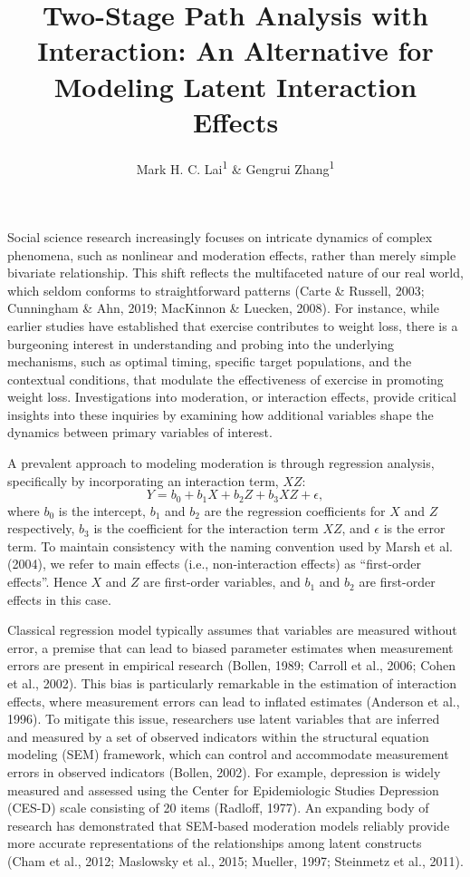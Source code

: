 \documentclass[
  man,mask]{apa6}
\title{Two-Stage Path Analysis with Interaction: An Alternative for Modeling Latent Interaction Effects}
\author{Mark H. C. Lai\textsuperscript{1} \& Gengrui Zhang\textsuperscript{1}}
\date{}
\affiliation{\vspace{0.5cm}\textsuperscript{1} \protect{Department of Psychology, University of Southern California}}
\begin{document}
\maketitle

Social science research increasingly focuses on intricate dynamics of complex phenomena, such as nonlinear and moderation effects, rather than merely simple bivariate relationship. This shift reflects the multifaceted nature of our real world, which seldom conforms to straightforward patterns (Carte \& Russell, 2003; Cunningham \& Ahn, 2019; MacKinnon \& Luecken, 2008). For instance, while earlier studies have established that exercise contributes to weight loss, there is a burgeoning interest in understanding and probing into the underlying mechanisms, such as optimal timing, specific target populations, and the contextual conditions, that modulate the effectiveness of exercise in promoting weight loss. Investigations into moderation, or interaction effects, provide critical insights into these inquiries by examining how additional variables shape the dynamics between primary variables of interest.

A prevalent approach to modeling moderation is through regression analysis, specifically by incorporating an interaction term, \(XZ\):
\begin{equation}
Y = b_{0} + b_{1}X + b_{2}Z + b_{3}XZ + \epsilon,
\end{equation}
where \(b_{0}\) is the intercept, \(b_{1}\) and \(b_{2}\) are the regression coefficients for \(X\) and \(Z\) respectively, \(b_{3}\) is the coefficient for the interaction term \(XZ\), and \(\epsilon\) is the error term. To maintain consistency with the naming convention used by Marsh et al. (2004), we refer to main effects (i.e., non-interaction effects) as ``first-order effects''. Hence \(X\) and \(Z\) are first-order variables, and \(b_{1}\) and \(b_{2}\) are first-order effects in this case.

Classical regression model typically assumes that variables are measured without error, a premise that can lead to biased parameter estimates when measurement errors are present in empirical research (Bollen, 1989; Carroll et al., 2006; Cohen et al., 2002). This bias is particularly remarkable in the estimation of interaction effects, where measurement errors can lead to inflated estimates (Anderson et al., 1996). To mitigate this issue, researchers use latent variables that are inferred and measured by a set of observed indicators within the structural equation modeling (SEM) framework, which can control and accommodate measurement errors in observed indicators (Bollen, 2002). For example, depression is widely measured and assessed using the Center for Epidemiologic Studies Depression (CES-D) scale consisting of 20 items (Radloff, 1977). An expanding body of research has demonstrated that SEM-based moderation models reliably provide more accurate representations of the relationships among latent constructs (Cham et al., 2012; Maslowsky et al., 2015; Mueller, 1997; Steinmetz et al., 2011).
\end{document}
